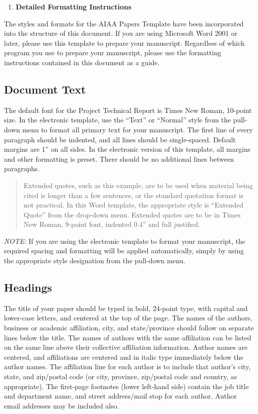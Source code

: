 \begin{enumerate}
\def\labelenumi{\arabic{enumi}.}
\setcounter{enumi}{3}
\item
  \textbf{Detailed Formatting Instructions}
\end{enumerate}

The styles and formats for the AIAA Papers Template have been
incorporated into the structure of this document. If you are using
Microsoft Word 2001 or later, please use this template to prepare your
manuscript. Regardless of which program you use to prepare your
manuscript, please use the formatting instructions contained in this
document as a guide.

\subsection{Document Text}\label{document-text}

The default font for the Project Technical Report is Times New Roman,
10-point size. In the electronic template, use the ``Text'' or
``Normal'' style from the pull-down menu to format all primary text for
your manuscript. The first line of every paragraph should be indented,
and all lines should be single-spaced. Default margins are 1'' on all
sides. In the electronic version of this template, all margins and other
formatting is preset. There should be no additional lines between
paragraphs.

\begin{quote}
Extended quotes, such as this example, are to be used when material
being cited is longer than a few sentences, or the standard quotation
format is not practical. In this Word template, the appropriate style is
``Extended Quote'' from the drop-down menu. Extended quotes are to be in
Times New Roman, 9-point font, indented 0.4'' and full justified.
\end{quote}

\emph{NOTE:} If you are using the electronic template to format your
manuscript, the required spacing and formatting will be applied
automatically, simply by using the appropriate style designation from
the pull-down menu.

\subsection{Headings}\label{headings}

The title of your paper should be typed in bold, 24-point type, with
capital and lower-case letters, and centered at the top of the page. The
names of the authors, business or academic affiliation, city, and
state/province should follow on separate lines below the title. The
names of authors with the same affiliation can be listed on the same
line above their collective affiliation information. Author names are
centered, and affiliations are centered and in italic type immediately
below the author names. The affiliation line for each author is to
include that author's city, state, and zip/postal code (or city,
province, zip/postal code and country, as appropriate). The first-page
footnotes (lower left-hand side) contain the job title and department
name, and street address/mail stop for each author. Author email
addresses may be included also.

